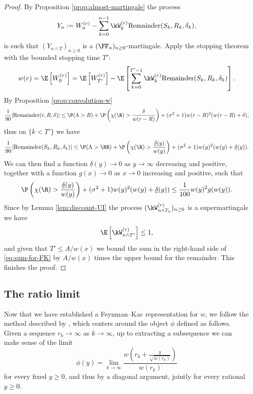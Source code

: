 \documentclass[10pt,a4paper]{article}
\begin{document}
\begin{proof}
By Proposition \ref{prop:almost-martingale} the process
\[ Y_n := W_n^{(r)} - \sum_{k=0}^{n-1} \kW^{(r)}_k \mathrm{Remainder}(S_k, R_k, \delta_k) , \]
is such that $(Y_{n\wedge T})_{n\geq 0}$ is a $(\FF_n)_{n\geq 0}$-martingale. Apply the stopping theorem with the bounded stopping time $T'$:
\begin{align}\label{eq:sum-for-FK}
w(r) = \E\left[ W^{(r)}_0 \right] = \E\left[ W_{T'}^{(r)} \right] - \E\left[ \sum_{k=0}^{T'-1} \kW^{(r)}_k \mathrm{Remainder}(S_k, R_k, \delta_k) \right] .
\end{align}
By Proposition \ref{prop:convolution-w} 
\[ \frac{1}{90} |\mathrm{Remainder}(r, R, \delta)| \leq \P(\Lambda>R) + \P\left(\chi(\R)>\frac{\delta}{w(r-R)}\right) + (\sigma^2+1) w(r-R)^2(w(r-R)+\delta) , \]
thus on $\{ k < T'\}$ we have
\begin{align*}
\frac{1}{90} |\mathrm{Remainder}(S_k, R_k, \delta_k)| \leq \P(\Lambda>\RR) + \P\left(\chi(\R)>\frac{\underline{\delta}(y)}{w(y)}\right) + (\sigma^2+1) w(y)^2(w(y)+\underline{\delta}(y)) .
\end{align*}
We can then find a function $\underline{\delta}(y)\to 0$ as $y\to\infty$ decreasing and positive, together with a function $g(x) \to 0$ as $x\to 0$ increasing and positive, such that 
\begin{align*}
\P\left(\chi(\R)>\frac{\underline{\delta}(y)}{w(y)}\right) + (\sigma^2+1) w(y)^2(w(y)+ \underline{\delta}(y)) \leq \frac{1}{100} w(y)^2 g(w(y)) .
\end{align*}
Since by Lemma \ref{lem:discount-UI} the process $(\kW^{(r)}_{n\wedge T_a})_{n\geq 0}$ is a supermartingale we have 
\[ \E\left[ \kW^{(r)}_{n\wedge T'} \right] \leq 1 , \]
and given that $T'\leq A/w(x)$ we bound the sum in the right-hand side of \eqref{eq:sum-for-FK} by $A/w(x)$ times the upper bound for the remainder. This finishes the proof. 
\end{proof}






\subsection{The ratio limit}
\label{sec:ratio-limit}


Now that we have established a Feynman--Kac representation for $w$, we follow the method described by \cite[Section 2.3]{lalley2015maximal}, which centers around the object $\phi$ defined as follows. Given a sequence $r_k \to \infty$ as $k\to\infty$, up to extracting a subsequence we can make sense of the limit
\begin{equation}\label{eq:phi}
\phi(y) = \lim_{k\to\infty} \frac{w\left( r_k + \frac{y}{\sqrt{w(r_k)}}\right)}{w(r_k)}
\end{equation}
for every fixed $y\geq 0$, and thus by a diagonal argument, jointly for every rational $y\geq 0$.
\end{document}
